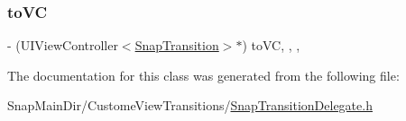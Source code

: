\hypertarget{interface_snap_transition_animator_a3ab09fc392eac91f4fa18230936fba7e}{}\label{interface_snap_transition_animator_a3ab09fc392eac91f4fa18230936fba7e} 
\subsubsection{\texorpdfstring{to\+VC}{toVC}}
{\footnotesize\ttfamily -\/ (U\+I\+View\+Controller$<$\hyperlink{protocol_snap_transition-p}{Snap\+Transition}$>$$\ast$) to\+VC\hspace{0.3cm}{\ttfamily [read]}, {\ttfamily [write]}, {\ttfamily [nonatomic]}, {\ttfamily [weak]}}



The documentation for this class was generated from the following file\+:\begin{DoxyCompactItemize}
\item 
Snap\+Main\+Dir/\+Custome\+View\+Transitions/\hyperlink{_snap_transition_delegate_8h}{Snap\+Transition\+Delegate.\+h}\end{DoxyCompactItemize}
